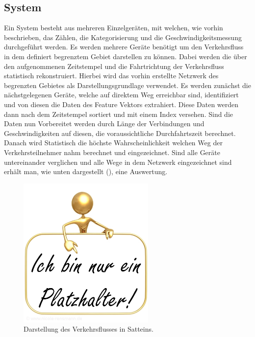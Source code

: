 \subsection{System}
Ein System besteht aus mehreren Einzelgeräten, mit welchen, wie vorhin beschrieben, das Zählen, die Kategorisierung und die Geschwindigkeitsmessung durchgeführt werden. Es werden mehrere Geräte benötigt um den Verkehrsfluss in dem definiert begrenztem Gebiet darstellen zu können. Dabei werden die über den aufgenommenen Zeitstempel und die Fahrtrichtung der Verkehrsfluss statistisch rekonstruiert. Hierbei wird das vorhin erstellte Netzwerk des begrenzten Gebietes als Darstellungsgrundlage verwendet. Es werden zunächst die nächstgelegenen Geräte, welche auf direktem Weg erreichbar sind, identifiziert und von diesen die Daten des Feature Vektors extrahiert. Diese Daten werden dann nach dem Zeitstempel sortiert und mit einem Index versehen. Sind die Daten nun Vorbereitet werden durch Länge der Verbindungen und Geschwindigkeiten auf diesen, die voraussichtliche Durchfahrtszeit berechnet. Danach wird Statistisch die höchste Wahrscheinlichkeit welchen Weg der Verkehrsteilnehmer nahm berechnet und eingezeichnet. Sind alle Geräte untereinander verglichen und alle Wege in dem Netzwerk eingezeichnet sind erhält man, wie unten dargestellt (), eine Auswertung. 

\begin{figure}[H]
  \centering
  \includegraphics[width=0.6\textwidth]{Resultate/Auswertung.jpg} 
  \caption{Darstellung des Verkehrsflusses in Satteins.}
  \label{bAuswertung}
\end{figure}